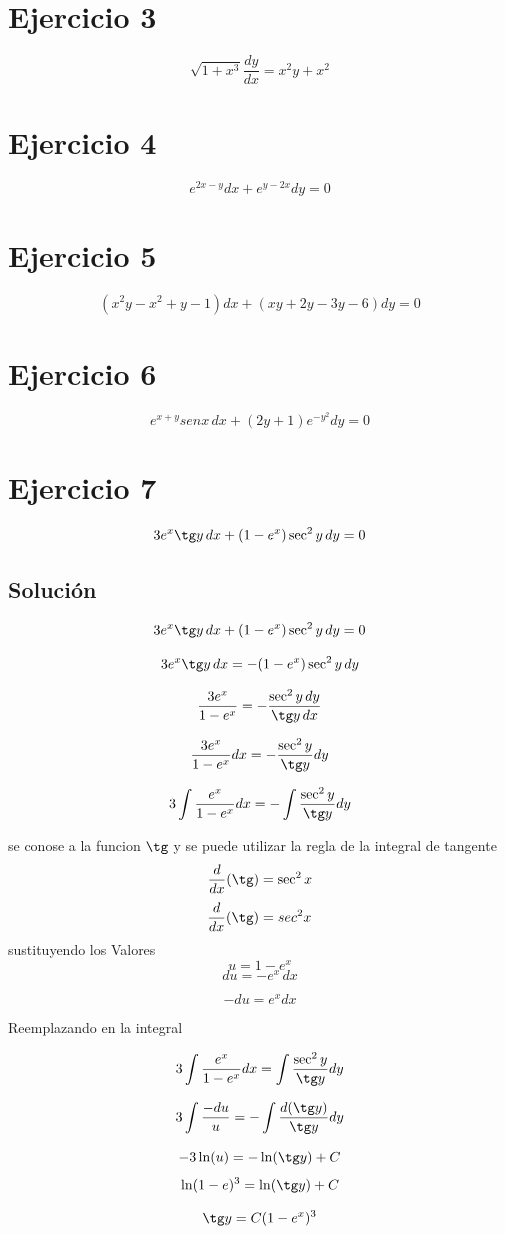 \documentclass[12pt,a4paper]{article}
\begin{document}
\begin{multicols}{2}
\section*{Ejercicio 3}
\[\sqrt{1+x^3}\frac{dy}{dx}=x^2y+x^2 \]

\section*{Ejercicio 4}
\[e^{2x-y}dx+e^{y-2x}dy=0\]

\section*{Ejercicio 5}
\[(x^2y-x^2+y-1)dx+(xy+2y-3y-6)dy=0\]

\section*{Ejercicio 6}
\[e^{x+y}senx \, dx+(2y+1)e^{-y^2}dy=0\]


\section*{Ejercicio 7} \[3e^x\tg y \, dx+(1-e^x)\sec^2 y \, dy=0\] 
\subsection*{Solución} 
\[3e^x\tg y \, dx+(1-e^x)\sec^2 y \, dy=0\] 

\[3e^x\tg y\,dx=-(1-e^x)\sec^2 y\,dy\] 

\[\frac{3e^x}{1-e^x}=-\frac{\sec^2 y\,dy}{\tg y\,dx}\] 

\[\frac{3e^x}{1-e^x}dx=-\frac{\sec^2 y}{\tg y}dy\] 

\[3\int\frac{e^x}{1-e^x}dx=-\int\frac{\sec^2 y}{\tg y}dy\]  

se conose a la funcion $\tg$ y se puede utilizar la regla de la integral de tangente \[\frac{d}{dx}(\tg)=\sec^2x\]
\[\frac{d}{dx}(\tg)=sec^2x\] 
sustituyendo los Valores \[u=1-e^x\] \[du=-e^x\,dx\] 

\[-du=e^xdx\]

Reemplazando en la integral 

\[3\int\frac{e^x}{1-e^x}dx=\int\frac{\sec^2 y}{\tg y}dy\] 

\[3\int\frac{-du}{u}=-\int\frac{d(\tg y)}{\tg y}dy\] 

\[-3\ln(u)=-\ln(\tg y)+C\] \[\ln(1-e)^3=\ln(\tg y)+C\] 

\[\tg y=C(1-e^x)^3\] 


\end{multicols}
\end{document}
